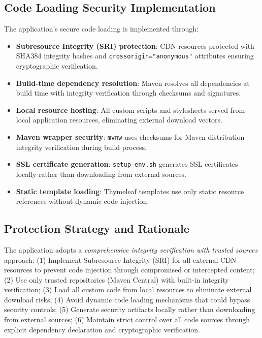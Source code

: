 \documentclass[]{UCD_CS_FYP_Report}
\begin{document}
\subsection{Code Loading Security Implementation}
The application's secure code loading is implemented through:
\begin{itemize}
	\item \textbf{Subresource Integrity (SRI) protection}: CDN resources protected with SHA384 integrity hashes and \texttt{crossorigin="anonymous"} attributes ensuring cryptographic verification.
	\item \textbf{Build-time dependency resolution}: Maven resolves all dependencies at build time with integrity verification through checksums and signatures.
	\item \textbf{Local resource hosting}: All custom scripts and stylesheets served from local application resources, eliminating external download vectors.
	\item \textbf{Maven wrapper security}: \texttt{mvnw} uses checksums for Maven distribution integrity verification during build process.
	\item \textbf{SSL certificate generation}: \texttt{setup-env.sh} generates SSL certificates locally rather than downloading from external sources.
	\item \textbf{Static template loading}: Thymeleaf templates use only static resource references without dynamic code injection.
\end{itemize}

\subsection{Protection Strategy and Rationale}
The application adopts a \textit{comprehensive integrity verification with trusted sources} approach: (1) Implement Subresource Integrity (SRI) for all external CDN resources to prevent code injection through compromised or intercepted content; (2) Use only trusted repositories (Maven Central) with built-in integrity verification; (3) Load all custom code from local resources to eliminate external download risks; (4) Avoid dynamic code loading mechanisms that could bypass security controls; (5) Generate security artifacts locally rather than downloading from external sources; (6) Maintain strict control over all code sources through explicit dependency declaration and cryptographic verification.
\end{document}

